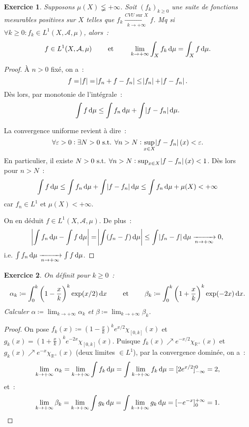 \documentclass{article}
\newtheorem{ex}{Exercice}[section]
\theoremstyle{definition}
\newcommand{\pinfty}{{+\infty}}
\newcommand{\minfty}{{-\infty}}
\newcommand{\st}{\text{ s.t. }}
\newcommand{\R}{{\mathbb R}}
\begin{document}
\begin{ex} Supposons $\mu(X) \lneqq \pinfty$. Soit $(f_k)_{k \geq 0}$ une suite de fonctions mesurables positives sur $X$ telles que
$f_k \xrightarrow[k \to \pinfty]{CVU \text{ sur }X} f$. Mq si $\forall k \geq 0 : f_k \in L^1(X, \mathcal A, \mu)$, alors~:
\[f \in L^1(X, \mathcal A, \mu) \qquad \text{ et } \qquad \lim_{k \to \pinfty}\int_Xf_k\dif\mu = \int_Xf\dif\mu.\]
\end{ex}

\begin{proof} À $n > 0$ fixé, on a~:
\[f = \abs f = \abs {f_n + f - f_n} \leq \abs {f_n} + \abs {f - f_n}.\]
Dès lors, par monotonie de l'intégrale~:
\[\int f\dif \mu \leq \int f_n\dif \mu + \int \abs {f-f_n}\dif\mu.\]

La convergence uniforme revient à dire~:
\[\forall \varepsilon > 0 : \exists N > 0 \st \forall n > N : \sup_{x \in X}\abs {f - f_n}(x) < \varepsilon.\]
En particulier, il existe $N > 0 \st \forall n > N : \sup_{x \in X}\abs {f - f_n}(x) < 1$. Dès lors pour $n > N$~:
\[\int f\dif\mu \leq \int f_n\dif \mu + \int \abs {f - f_n}\dif \mu \leq \int f_n \dif\mu + \mu(X) < \pinfty\]
car $f_n \in L^1$ et $\mu(X) < \pinfty$.

On en déduit $f \in L^1(X, \mathcal A, \mu)$. De plus~:
\[\abs {\int f_n\dif\mu - \int f\dif\mu} = \abs {\int (f_n-f)\dif\mu} \leq \int \abs {f_n - f}\dif\mu \xrightarrow[n \to \pinfty]{} 0,\]
i.e. $\int f_n\dif\mu \xrightarrow[n \to \pinfty]{} \int f\dif\mu$.
\end{proof}

\begin{ex} On définit pour $k \geq 0$~:
\[\alpha_k \coloneqq \int_0^k\left(1 - \frac xk\right)^k\exp(x/2)\dif x \qquad \text{ et } \qquad \beta_k \coloneqq \int_0^k\left(1 + \frac xk\right)^k\exp(-2x)\dif x.\]
Calculer $\alpha \coloneqq \lim_{k \to \pinfty}\alpha_k$ et $\beta \coloneqq \lim_{k \to \pinfty} \beta_k$.
\end{ex}

\begin{proof} On pose $f_k(x) \coloneqq \left(1-\frac xk\right)^ke^{x/2}\chi_{[0, k]}(x)$ et $g_k(x) = \left(1+\frac xk\right)^ke^{-2x}\chi_{[0, k]}(x)$.
Puisque $f_k(x) \nearrow e^{-x/2}\chi_{\R^+}(x)$ et $g_k(x) \nearrow e^{-x}\chi_{\R^+}(x)$ (deux limites $\in L^1$), par la convergence dominée, on a~:
\[\lim_{k \to \pinfty} \alpha_k = \lim_{k \to \pinfty}\int f_k\dif\mu = \int\lim_{k \to \pinfty}f_k\dif\mu = [2e^{x/2}]_{\minfty}^0 = 2,\]
et~:
\[\lim_{k \to \pinfty}\beta_k = \lim_{k \to \pinfty}\int g_k\dif\mu = \int\lim_{k \to \pinfty}g_k\dif\mu = [-e^{-x}]_0^\pinfty = 1.\]
\end{proof}
\end{document}

